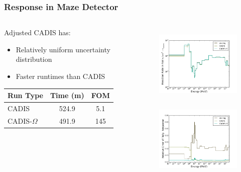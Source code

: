\documentclass[xcolor=x11names,compress,handout]{beamer}
\renewcommand{\(}{\begin{columns}}
\renewcommand{\)}{\end{columns}}
\newcommand{\<}[1]{\begin{column}{#1}}
\renewcommand{\>}{\end{column}}
\begin{document}
%
\begin{frame}[fragile]
  \frametitle{Response in Maze Detector}
  
\begin{columns}
  \begin{column}{0.45\textwidth}
  Adjusted CADIS has:
  \begin{itemize}
    \item Relatively uniform uncertainty distribution
    \item Faster runtimes than CADIS
  \end{itemize}
  \vspace*{.5em}
  \begin{tabular}{|l|c c|}
  \hline
      Run Type & Time (m) & FOM \\  
      \hline
      CADIS  & 524.9  &  5.1 \\
      CADIS-$\Omega$ & 491.9 & 145 \\
      \hline
  \end{tabular}
  \end{column}
  \begin{column}{0.55\textwidth}
  	\begin{figure}
  	\begin{center}
  		\includegraphics[height=1.5in,clip]{../figs/maze-results.png}\\
  		\includegraphics[height=1.5in,clip]{../figs/maze-re.png}
	\end{center}
  	\end{figure}
  \end{column}
\end{columns}
\end{frame}
\end{document}
